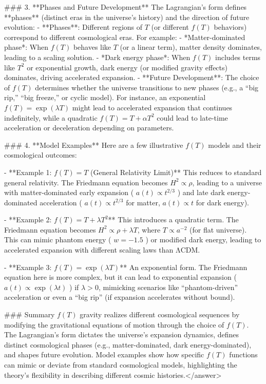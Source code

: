 ### 3. **Phases and Future Development**  
The Lagrangian’s form defines **phases** (distinct eras in the universe’s history) and the direction of future evolution:  
- **Phases**: Different regions of \( T \) (or different \( f(T) \) behaviors) correspond to different cosmological eras. For example:  
  - *Matter-dominated phase*: When \( f(T) \) behaves like \( T \) (or a linear term), matter density dominates, leading to a scaling solution.  
  - *Dark energy phase*: When \( f(T) \) includes terms like \( T^2 \) or exponential growth, dark energy (or modified gravity effects) dominates, driving accelerated expansion.  
- **Future Development**: The choice of \( f(T) \) determines whether the universe transitions to new phases (e.g., a “big rip,” “big freeze,” or cyclic model). For instance, an exponential \( f(T) = \exp(\lambda T) \) might lead to accelerated expansion that continues indefinitely, while a quadratic \( f(T) = T + \alpha T^2 \) could lead to late-time acceleration or deceleration depending on parameters.  


### 4. **Model Examples**  
Here are a few illustrative \( f(T) \) models and their cosmological outcomes:  

- **Example 1: \( f(T) = T \) (General Relativity Limit)**  
  This reduces to standard general relativity. The Friedmann equation becomes \( H^2 \propto \rho \), leading to a universe with matter-dominated early expansion ( \( a(t) \propto t^{2/3} \) ) and late dark energy-dominated acceleration ( \( a(t) \propto t^{2/3} \) for matter, \( a(t) \propto t \) for dark energy).  

- **Example 2: \( f(T) = T + \lambda T^2 \)**  
  This introduces a quadratic term. The Friedmann equation becomes \( H^2 \propto \rho + \lambda T \), where \( T \propto a^{-2} \) (for flat universe). This can mimic phantom energy ( \( w = -1.5 \) ) or modified dark energy, leading to accelerated expansion with different scaling laws than ΛCDM.  

- **Example 3: \( f(T) = \exp(\lambda T) \)**  
  An exponential form. The Friedmann equation here is more complex, but it can lead to exponential expansion ( \( a(t) \propto \exp(\lambda t) \) ) if \( \lambda > 0 \), mimicking scenarios like “phantom-driven” acceleration or even a “big rip” (if expansion accelerates without bound).  


### Summary  
\( f(T) \) gravity realizes different cosmological sequences by modifying the gravitational equations of motion through the choice of \( f(T) \). The Lagrangian’s form dictates the universe’s expansion dynamics, defines distinct cosmological phases (e.g., matter-dominated, dark energy-dominated), and shapes future evolution. Model examples show how specific \( f(T) \) functions can mimic or deviate from standard cosmological models, highlighting the theory’s flexibility in describing different cosmic histories.</answer>